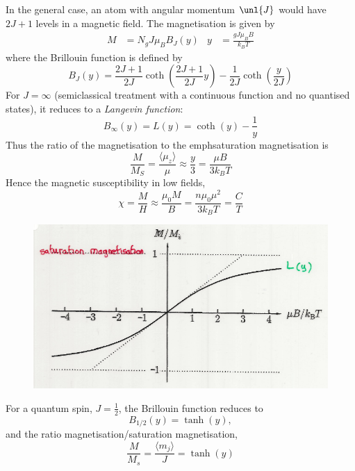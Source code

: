 \documentclass[a4paper, 11pt, normalem]{report}
\begin{document}
In the general case, an atom with angular momentum $\unl{J}$ would have $2J+1$ levels in a magnetic field.
The magnetisation is given by
\begin{align}
    M &= N_gJ\mu_BB_J(y) & y &= \frac{gJ\mu_BB}{k_BT}
\end{align}
where the Brillouin function is defined by
\begin{equation}
    B_J(y) = \frac{2J+1}{2J}\coth\left(\frac{2J+1}{2J}y\right) - \frac{1}{2J}\coth\left(\frac{y}{2J}\right)
\end{equation}
For $J=\infty$ (semiclassical treatment with a continuous function and no quantised states), it reduces to a \emph{Langevin function}:
\begin{equation}
    B_\infty(y) = L(y) = \coth(y) - \frac{1}{y}
\end{equation}
Thus the ratio of the magnetisation to the emph{saturation magnetisation} is
\begin{equation}
    \frac{M}{M_S} = \frac{\langle\mu_z\rangle}{\mu} \approx \frac{y}{3} = \frac{\mu B}{3k_BT}
\end{equation}
Hence the magnetic susceptibility in low fields, 
\begin{equation}
    \chi = \frac{M}{H} \approx \frac{\mu_0M}{B} = \frac{n\mu_0\mu^2}{3k_BT} = \frac{C}{T}
\end{equation}
\begin{figure}[H]
    \centering
    \includegraphics[scale=0.5]{satmag.png}
\end{figure}
For a quantum spin, $J = \frac12$, the Brillouin function reduces to
\begin{equation}
    B_{1/2}(y) = \tanh(y),
\end{equation}
and the ratio magnetisation/saturation magnetisation,
\begin{equation}
    \frac{M}{M_s} = \frac{\langle m_j\rangle}{J} = \tanh(y)
\end{equation}
\end{document}
